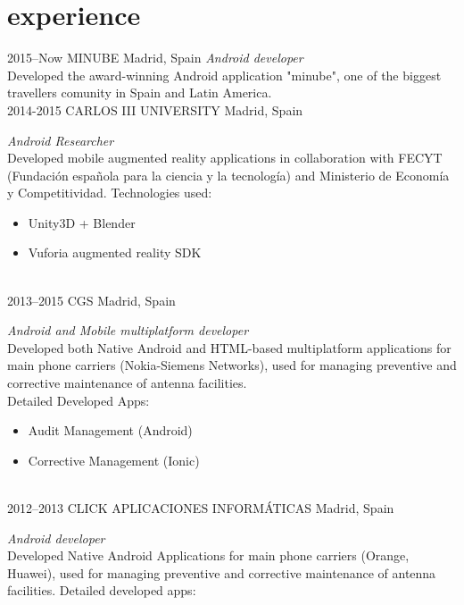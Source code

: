 \documentclass[]{friggeri-cv} %
\begin{document}

\section{experience}

\begin{entrylist}


\entry
{2015--Now}
{MINUBE}
{Madrid, Spain}
{\emph{Android developer} \\
Developed the award-winning Android application "minube", one of the biggest travellers comunity in Spain and Latin America.}
\\
\entry
{2014-2015}
{CARLOS III UNIVERSITY}
{Madrid, Spain}
{\emph{Android Researcher} \\
Developed mobile augmented reality applications in collaboration with FECYT (Fundación española para la ciencia y la tecnología) and Ministerio de Economía y Competitividad. Technologies used:

\begin{itemize}
\item Unity3D + Blender
\item Vuforia augmented reality SDK
\end{itemize}}
\\


\entry
{2013--2015}
{CGS}
{Madrid, Spain}
{\emph{Android and Mobile multiplatform developer} \\
Developed both Native Android and HTML-based multiplatform applications for main phone carriers (Nokia-Siemens Networks), used for managing preventive and corrective maintenance of antenna facilities. \\
Detailed Developed Apps:

\begin{itemize}
\item Audit Management (Android)
\item Corrective Management (Ionic)
\end{itemize}}
\\


\entry
{2012--2013}
{CLICK APLICACIONES INFORMÁTICAS}
{Madrid, Spain}
{\emph{Android developer} \\
Developed Native Android Applications for main phone carriers (Orange, Huawei), used for managing preventive and corrective maintenance of antenna facilities. Detailed developed apps:

}
\end{entrylist}
\end{document}
